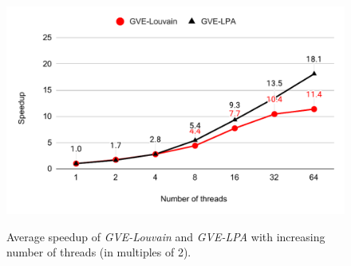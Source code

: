 \begin{figure}[hbtp]
  \centering
  \includegraphics[width=0.98\linewidth]{out/rak-ss.pdf} \\[0ex]
  \caption{Average speedup of \textit{GVE-Louvain} and \textit{GVE-LPA} with increasing number of threads (in multiples of 2).}
  \label{fig:rak-ss}
\end{figure}

